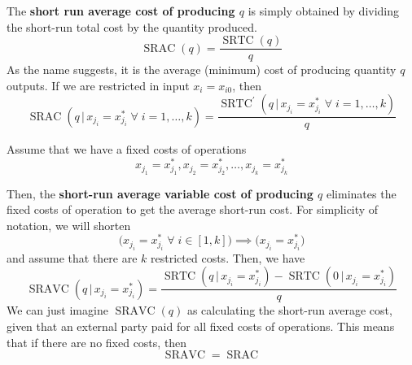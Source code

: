 \documentclass{article}
\DeclareMathOperator{\SRTC}{SRTC}
\DeclareMathOperator{\SRAC}{SRAC}
\DeclareMathOperator{\SRAVC}{SRAVC}
\begin{document}
      \begin{definition}
        \label{def:short-run-average-cost}
        The \textbf{short run average cost of producing $q$} is simply obtained by dividing the short-run total cost by the quantity produced. 
        \begin{equation}
          \SRAC (q) = \frac{\SRTC(q)}{q}
        \end{equation}
        As the name suggests, it is the average (minimum) cost of producing quantity $q$ outputs. If we are restricted in input $x_i = x_{i0}$, then 
        \begin{equation}
          \SRAC(q\,|\, x_{j_i} = x_{j_i}^* \;\forall\; i = 1, \ldots, k) = \frac{\SRTC^\prime (q\,|\, x_{j_i} = x_{j_i}^* \;\forall\; i = 1, \ldots, k)}{q}
        \end{equation}
      \end{definition}

      \begin{definition}
        \label{def:short-run-average-variable-cost}
        Assume that we have a fixed costs of operations 
        \begin{equation}
          x_{j_1} = x_{j_1}^*, x_{j_2} = x_{j_2}^*, \ldots, x_{j_k} = x_{j_k}^*
        \end{equation}
         
        Then, the \textbf{short-run average variable cost of producing $q$} eliminates the fixed costs of operation to get the average short-run cost. For simplicity of notation, we will shorten 
        \begin{equation}
          \big( x_{j_i} = x_{j_i}^* \;\forall\; i \in [1,k]\big) \implies \big(  x_{j_i} = x_{j_i}^*  \big)
        \end{equation}
        and assume that there are $k$ restricted costs. Then, we have 
        \begin{equation}
          \SRAVC(q\,|\, x_{j_i} = x_{j_i}^*) = \frac{\SRTC(q\,|\, x_{j_i} = x_{j_i}^*) - \SRTC(0\,|\, x_{j_i} = x_{j_i}^*)}{q}
        \end{equation}
        We can just imagine $\SRAVC(q)$ as calculating the short-run average cost, given that an external party paid for all fixed costs of operations. This means that if there are no fixed costs, then 
        \begin{equation}
          \SRAVC = \SRAC
        \end{equation}
      \end{definition}
\end{document}

